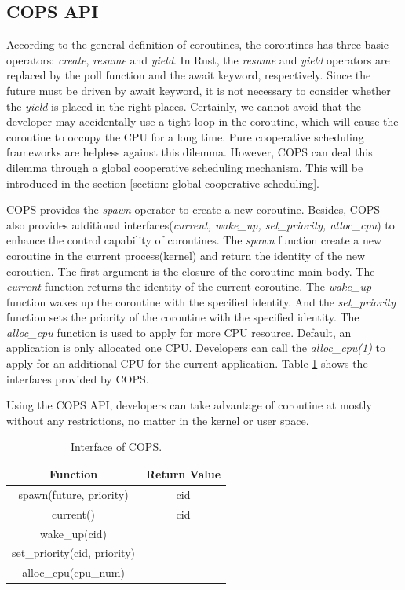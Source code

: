 \documentclass[sigconf,review,anonymous]{acmart}
\begin{document}
\subsection{COPS API}
\label{section: cops api}

According to the general definition of coroutines, the coroutines has three basic operators: \textit{create}, \textit{resume} and \textit{yield}. In Rust, the \textit{resume} and \textit{yield} operators are replaced by the poll function and the await keyword, respectively. Since the future must be driven by await keyword, it is not necessary to consider whether the \textit{yield} is placed in the right places. Certainly, we cannot avoid that the developer may accidentally use a tight loop in the coroutine, which will cause the coroutine to occupy the CPU for a long time. Pure cooperative scheduling frameworks are helpless against this dilemma. However, COPS can deal this dilemma through a global cooperative scheduling mechanism. This will be introduced in the section \ref{section: global-cooperative-scheduling}.

COPS provides the \textit{spawn} operator to create a new coroutine. Besides, COPS also provides additional interfaces(\textit{current, wake\_up, set\_priority, alloc\_cpu}) to enhance the control capability of coroutines. The \textit{spawn} function create a new coroutine in the current process(kernel) and return the identity of the new coroutien. The first argument is the closure of the coroutine main body. The \textit{current} function returns the identity of the current coroutine. The \textit{wake\_up} function wakes up the coroutine with the specified identity. And the \textit{set\_priority} function sets the priority of the coroutine with the specified identity. The \textit{alloc\_cpu} function is used to apply for more CPU resource. Default, an application is only allocated one CPU. Developers can call the \textit{alloc\_cpu(1)} to apply for an additional CPU for the current application. Table \ref{tab:interface} shows the interfaces provided by COPS.

Using the COPS API, developers can take advantage of coroutine at mostly without any restrictions, no matter in the kernel or user space.

\begin{table}[]
  \caption{Interface of COPS.}
  \label{tab:interface}
  \begin{tabular}{@{}cc@{}}
  \toprule
  Function                     & Return Value \\ \midrule
  spawn(future, priority)      & cid          \\
  current()                    & cid          \\
  wake\_up(cid)                &              \\
  set\_priority(cid, priority) &              \\
  alloc\_cpu(cpu\_num)          &              \\ \bottomrule
  \end{tabular}
\end{table}
\end{document}
